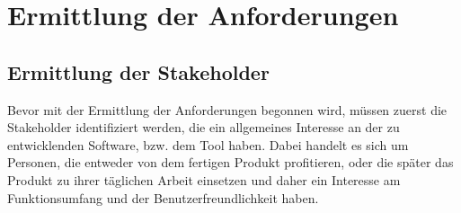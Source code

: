 \section{Ermittlung der Anforderungen}
\subsection{Ermittlung der Stakeholder}
Bevor mit der Ermittlung der Anforderungen begonnen wird, müssen zuerst die Stakeholder identifiziert werden, die ein allgemeines Interesse an der zu entwicklenden Software, bzw. dem Tool haben. Dabei handelt es sich um Personen, die entweder von dem fertigen Produkt profitieren, oder die später das Produkt zu ihrer täglichen Arbeit einsetzen und daher ein Interesse am Funktionsumfang und der Benutzerfreundlichkeit haben. 

